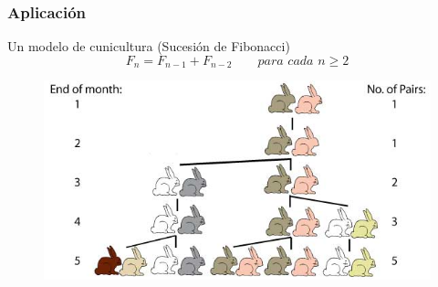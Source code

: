 \documentclass{beamer}
\begin{document}
\begin{frame}
	\frametitle{Aplicación}
	\begin{block}{Un modelo de cunicultura (Sucesión de Fibonacci)}
	$$F_n = F_{n-1} + F_{n-2} \qquad \textit{para cada $n \geq 2$}$$
	\end{block}

	\begin{block}{}
	\begin{figure}
		\centering
		\includegraphics[scale=0.40]{conejos.jpg}
	\end{figure}
	\end{block}

\end{frame}
\end{document}
